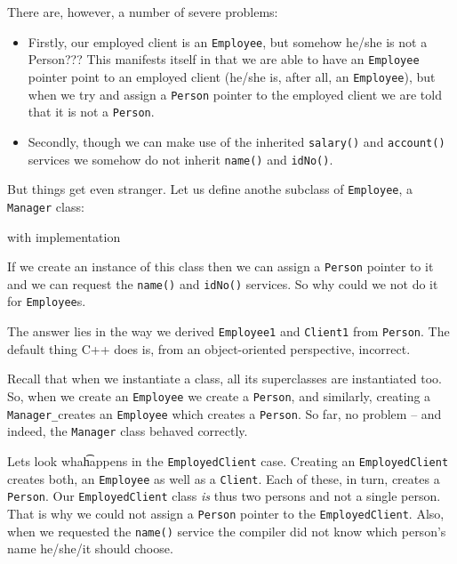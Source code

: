 There are, however, a number of severe problems: 
\begin{itemize}
  \item Firstly, our employed client is an \verb+Employee+, but somehow
        he/she is not a Person??? This manifests itself in that we
        are able to have an \verb+Employee+ pointer point to an employed client
        (he/she is, after all, an \verb+Employee+), but when we try and
        assign a \verb+Person+ pointer to the employed client we are told
        that it is not a \verb+Person+.
  \item Secondly, though we can make use of the inherited \verb+salary()+
        and \verb+account()+ services we somehow do not inherit \verb+name()+
        and \verb+idNo()+.
\end{itemize}

But things get even stranger. Let us define anothe subclass of \verb+Employee+,
a \verb+Manager+ class:

\noindent {\small }

with implementation

\noindent {\small }

If we create an instance of this class then we can assign a \verb+Person+ 
pointer to it and we can request the \verb+name()+ and \verb+idNo()+
services. So why could we not do it for \verb+Employee+s.

The answer lies in the way we derived \verb+Employee1+ and \verb+Client1+
from \verb+Person+. The default thing C++ does is, from an object-oriented 
perspective, incorrect.

Recall that when we instantiate a class, all its superclasses are 
instantiated too. So, when we create an \verb+Employee+ we create a 
\verb+Person+, and similarly, creating a \verb+Manager_+creates an 
\verb+Employee+ which creates a \verb+Person+. So far, no problem -- 
and indeed, the \verb+Manager+ class behaved correctly.

Lets look wha\t happens in the \verb+EmployedClient+ case. Creating an
\verb+EmployedClient+ creates both, an \verb+Employee+ as well as a
\verb+Client+. Each of these, in turn, creates a \verb+Person+. Our
\verb+EmployedClient+ class {\em is} thus two persons and not a single 
person. That is why we could not assign a \verb+Person+ pointer to the
\verb+EmployedClient+. Also, when we requested the \verb+name()+ service
the compiler did not know which person's name he/she/it should choose.

